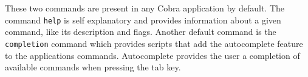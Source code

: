 These two commands are present in any Cobra application by default. The command \texttt{help} is self explanatory and provides information about a given command, like its description and flags. Another default command is the \texttt{completion} command which provides scripts that add the autocomplete feature to the applications commands. Autocomplete provides the user a completion of available commands when pressing the tab key.

